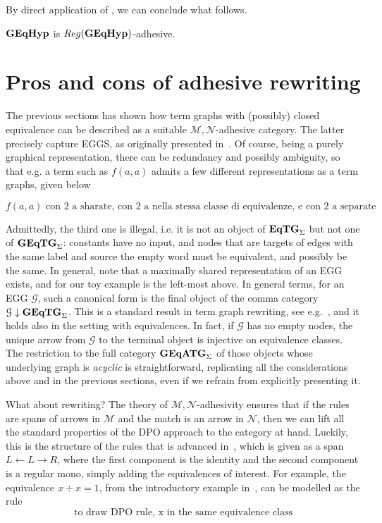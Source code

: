 \documentclass[a4paper,UKenglish,cleveref,pdftex,thm-restate,numberwithinsect]{lipics-v2021}
\newcommand{\catname}[1]{\textbf{\textup{#1}}}
\newcommand{\EqTGs}{\catname{EqTG}_{\Sigma}}
\newcommand{\GEqTGs}{\catname{GEqTG}_{\Sigma}}
\newcommand{\GEqATGs}{\catname{GEqATG}_{\Sigma}}
\newcommand{\egg}{\catname{GEqHyp}}
\newcommand{\reg}{\mathsf{Reg}}
\begin{document}
By direct application of , we can conclude what follows.

\begin{corollary}
	$\egg$ is $\reg(\egg)$-adhesive.
\end{corollary}

\section{Pros and cons of adhesive rewriting}
\label{rewriting}
The previous sections has shown how term graphs with (possibly) closed equivalence
can be described as a suitable $\mathcal{M},\mathcal{N}$-adhesive category. 
The latter precisely capture EGGS, as originally
presented in~\cite{WillseyNWFTP21}. 
%
Of course, being a purely graphical representation, there can be redundancy and possibly ambiguity,
so that e.g. a term such as $f(a,a)$ admits a few different representations as a term graphs, given below

\[f(a,a) \mbox{ con 2 a sharate, con 2 a nella stessa classe di equivalenze, e con 2 a separate}\]

Admittedly, the third one is illegal, i.e. it is not an object of $\EqTGs$ but not one of $\GEqTGs$: constants have no input, 
and nodes that are targets of edges with the same label and source the empty word must be equivalent,
and possibly be the same.
%
In general, note that a maximally shared representation of an EGG exists, and for our 
toy example is the left-most above. In general terms,
for an EGG $\mathcal{G}$, such a canonical form is the final object of the comma category 
$\mathcal{G}  \downarrow \GEqTGs$. 
This is a standard result in term graph rewriting, see e.g.~\cite{xxx}, and it holds also in the setting with equivalences.
In fact, if $\mathcal{G}$ has no empty nodes, the unique arrow from $\mathcal{G}$ to the terminal object
is injective on equivalence classes.
%
The restriction to the full category $\GEqATGs$ of those objects whose underlying graph is \emph{acyclic} is 
straightforward, replicating all the considerations 
above and in the previous sections, even if we refrain from explicitly presenting it.

What about rewriting? The theory of $\mathcal{M},\mathcal{N}$-adhesivity ensures that if the rules are spans of 
arrows in $\mathcal{M}$ and the match is an arrow in $\mathcal{N}$, then we can lift all the standard properties
of the DPO approach to the category at hand. Luckily, this is the structure of the rules that is advanced in~\cite{DetlefsNS05},
which is given as a span $L \leftarrow L \rightarrow R$, where the first component is the identity and the second
component is a regular mono, simply adding the equivalences of interest.
%
For example, the equivalence $x \div x = 1$, from the introductory example in~\cite{xxx}, 
can be modelled as the rule
\[\mbox{to draw DPO rule, x in the same equivalence class} \]
\end{document}
